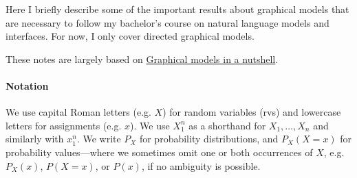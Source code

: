 Here I briefly describe some of the important results about graphical models that are necessary to follow my bachelor's course on natural language models and interfaces. For now, I only cover directed graphical models.

These notes are largely based on \href{https://homes.cs.washington.edu/~taskar/pubs/gms-srl07.pdf}{Graphical models in a nutshell}.


\paragraph{Notation}

We use capital Roman letters (e.g. $X$) for random variables (rvs) and lowercase letters for assignments (e.g. $x$). We use $X_1^n$ as a shorthand for $X_1, \ldots, X_n$ and similarly with $x_1^n$. 
We write $P_X$ for probability distributions, and $P_X(X=x)$ for probability values---where we sometimes omit one or both occurrences of $X$, e.g. $P_X(x)$, $P(X=x)$, or $P(x)$, if no ambiguity is possible. 


